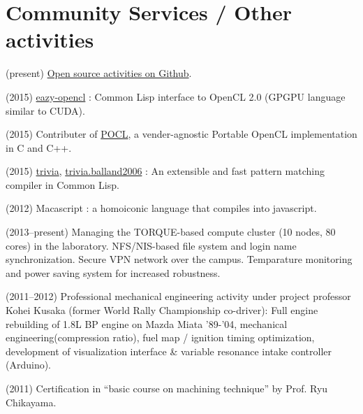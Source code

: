 \documentclass[letterpaper,12pt]{article}
\begin{document}
\section{Community Services / Other activities}

(present) \href{https://github.com/guicho271828}{Open source activities on Github}.

(2015) \href{https://github.com/guicho271828/eazy-opencl}{eazy-opencl}
: Common Lisp interface to OpenCL 2.0 (GPGPU language similar to CUDA).

(2015) Contributer of \href{https://github.com/pocl/pocl}{POCL},
a vender-agnostic Portable OpenCL implementation in C and C++.

(2015) \href{https://github.com/guicho271828/trivia}{trivia},
\href{https://github.com/guicho271828/trivia.balland2006}{trivia.balland2006}
: An extensible and fast pattern matching compiler in Common Lisp.

(2012) Macascript : a homoiconic language that compiles into javascript.

(2013--present)
 Managing the TORQUE-based compute cluster (10 nodes, 80 cores) in the laboratory.
 NFS/NIS-based file system and login name synchronization.
 Secure VPN network over the campus.
 Temparature monitoring and power saving system for increased robustness.

(2011--2012) Professional mechanical engineering
 activity under project professor Kohei Kusaka (former World Rally
 Championship co-driver):
 Full engine rebuilding of 1.8L BP engine on Mazda Miata '89-'04,
 mechanical engineering(compression ratio),
 fuel map / ignition timing optimization, development of visualization
 interface \& variable resonance intake controller (Arduino).

(2011) Certification in ``basic course on machining technique'' by Prof. Ryu Chikayama.

\end{document}
